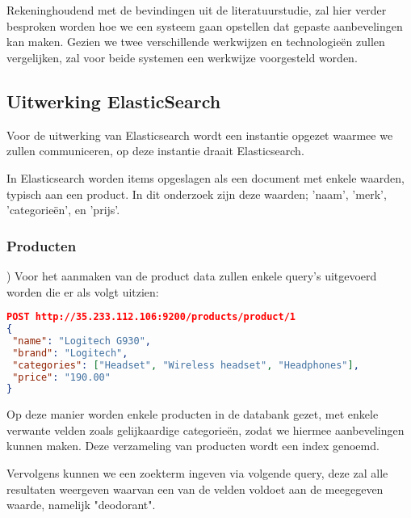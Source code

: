 

\chapter{}
\label{ch:methodologie}


Rekeninghoudend met de bevindingen uit de literatuurstudie, zal hier verder besproken worden hoe we een systeem gaan opstellen dat gepaste aanbevelingen kan maken. Gezien we twee verschillende werkwijzen en technologieën zullen vergelijken, zal voor beide systemen een werkwijze voorgesteld worden.

\section{Uitwerking ElasticSearch}
\label{sec:Uitwerking ElasticSearch}

Voor de uitwerking van Elasticsearch wordt een instantie opgezet waarmee we zullen communiceren, op deze instantie draait Elasticsearch. 

In Elasticsearch worden items opgeslagen als een document met enkele waarden, typisch aan een product. In dit onderzoek zijn deze waarden; 'naam', 'merk', 'categorieën', en 'prijs'. 

\subsection{Producten}
\label{sec:Producten})
Voor het aanmaken van de product data zullen enkele query's uitgevoerd worden die er als volgt uitzien:

\begin{lstlisting}[language=json,basicstyle=\small,firstnumber=1]
POST http://35.233.112.106:9200/products/product/1 
{ 
 "name": "Logitech G930",
 "brand": "Logitech",
 "categories": ["Headset", "Wireless headset", "Headphones"],
 "price": "190.00"
}
\end{lstlisting}

Op deze manier worden enkele producten in de databank gezet, met enkele verwante velden zoals gelijkaardige categorieën, zodat we hiermee aanbevelingen kunnen maken. Deze verzameling van producten wordt een index genoemd.

Vervolgens kunnen we een zoekterm ingeven via volgende query, deze zal alle resultaten weergeven waarvan een van de velden voldoet aan de meegegeven waarde, namelijk "deodorant". 

